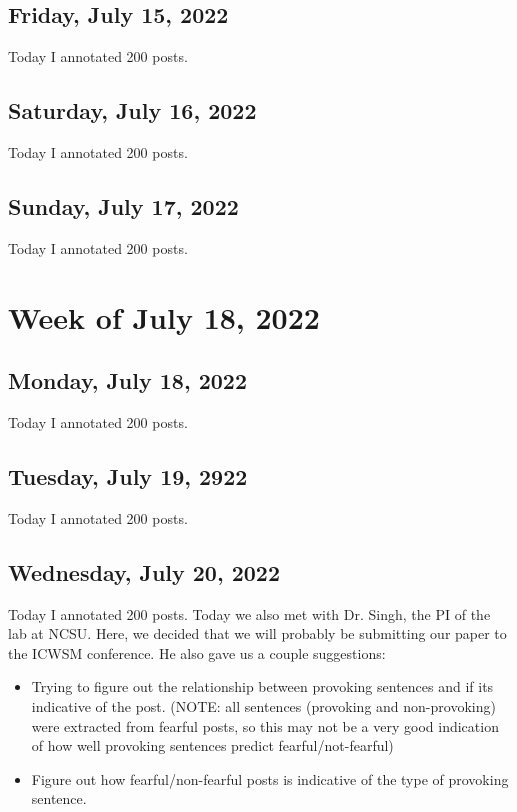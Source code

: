 \documentclass[11pt,letterpaper]{article}
\begin{document}
\subsection{Friday, July 15, 2022}
Today I annotated 200 posts.

\subsection{Saturday, July 16, 2022}
Today I annotated 200 posts.

\subsection{Sunday, July 17, 2022}
Today I annotated 200 posts.

\section{Week of July 18, 2022}
\subsection{Monday, July 18, 2022}
Today I annotated 200 posts.

\subsection{Tuesday, July 19, 2922}
Today I annotated 200 posts.

\subsection{Wednesday, July 20, 2022}
Today I annotated 200 posts. Today we also met with Dr. Singh, the PI of the lab at NCSU. Here, we decided that we will probably be submitting our paper to the ICWSM conference. He also gave us a couple suggestions:

\begin{itemize}
    \item Trying to figure out the relationship between provoking sentences and if its indicative of the post. (NOTE: all sentences (provoking and non-provoking) were extracted from fearful posts, so this may not be a very good indication of how well provoking sentences predict fearful/not-fearful)

    \item Figure out how fearful/non-fearful posts is indicative of the type of provoking sentence.
\end{itemize}
\end{document}
